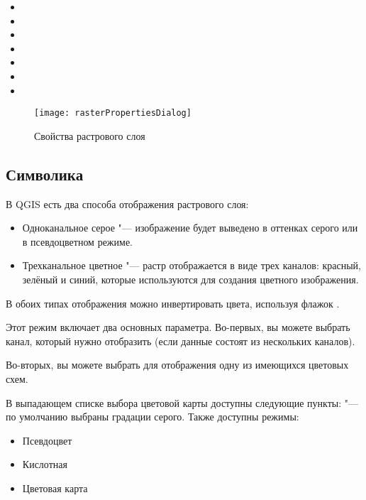 \begin{itemize}[label=--]
 \item {}
 \item {}
 \item {}
 \item {}
 \item {}
 \item {}
 \item {}
\end{itemize}

\begin{figure}[h]
  \centering
   \texttt{[image: rasterPropertiesDialog]}
   \caption{Свойства растрового слоя \wincaption}\label{fig:raster_properties}
\end{figure}

\subsection{Символика}\label{label_symbology}

В QGIS есть два способа отображения растрового слоя:

\begin{itemize}[label=--]
\item Одноканальное серое "--- изображение будет выведено в оттенках серого
или в псевдоцветном режиме.
\item Трехканальное цветное "--- растр отображается в виде трех каналов:
красный, зелёный и синий, которые используются для создания цветного
изображения.
\end{itemize}

В обоих типах отображения можно инвертировать цвета, используя флажок
.


Этот режим включает два основных параметра. Во-первых, вы можете выбрать канал,
который нужно отобразить (если данные состоят из нескольких каналов).

Во-вторых, вы можете выбрать для отображения одну из имеющихся цветовых схем.

В выпадающем списке выбора цветовой карты доступны следующие пункты:
 "--- по умолчанию выбраны
градации серого. Также доступны режимы:
\begin{itemize}[label=--]
\item Псевдоцвет
\item Кислотная
\item Цветовая карта
\end{itemize}

